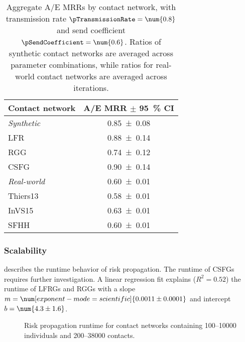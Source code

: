\begin{table}[htbp]
\centering
\begin{tabular}{lS}
  \toprule
  Contact network & {A/E MRR $\pm$ \qty{95}{\percent} CI}\\
  \midrule
  \textit{Synthetic} & \num{0.85 \pm 0.08}\\
  \tabindent LFR & \num{0.88 \pm 0.14}\\
  \tabindent RGG & \num{0.74 \pm 0.12}\\
  \tabindent CSFG & \num{0.90 \pm 0.14}\\
  \midrule
  \textit{Real-world} & \num{0.60 \pm 0.01}\\
  \tabindent Thiers13 & \num{0.58 \pm 0.01}\\
  \tabindent InVS15 & \num{0.63 \pm 0.01}\\
  \tabindent SFHH & \num{0.60 \pm 0.01}\\
  \bottomrule
\end{tabular}
\caption[Aggregate A/E MRRs by contact network]{Aggregate A/E MRRs by contact network, with transmission rate $\pTransmissionRate = \num{0.8}$ and send coefficient $\pSendCoefficient = \num{0.6}$. Ratios of synthetic contact networks are averaged across parameter combinations, while ratios for real-world contact networks are averaged across iterations.}
\label{tab:reachability}
\end{table}

\subsubsection{Scalability}

 describes the runtime behavior of risk propagation. The runtime of CSFGs requires further investigation. A linear regression fit explains ($R^2 = \num{0.52}$) the runtime of LFRGs and RGGs with a slope $m = \num[exponent-mode=scientific]{0.0011 \pm 0.0001}$ and intercept $b = \num{4.3 \pm 1.6}$.

\begin{figure}[htbp]
\centering
{}
\caption[Risk propagation runtime]{Risk propagation runtime for contact networks containing \numrange{100}{10000} individuals and \numrange{200}{38000} contacts.}
\label{fig:runtime}
\end{figure}

